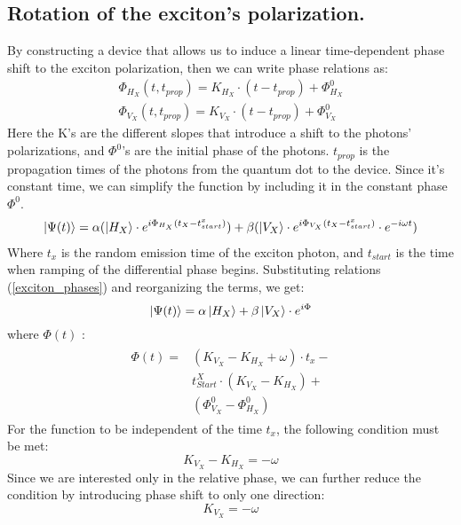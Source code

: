 \subsection*{Rotation of the exciton's polarization.}
By constructing a device that allows us to induce a linear time-dependent phase shift to the exciton polarization, then we can write phase relations as:
\begin{equation} \label{exciton_phases}
	\begin{aligned} 
		&\Phi_{H_{X}}{(t,t_{prop})} = K_{H_{X}}\cdot(t-t_{prop}) + \Phi^0_{H_{X}} &\\
		&\Phi_{V_{X}}{(t,t_{prop})} = K_{V_{X}}\cdot(t-t_{prop}) + \Phi^0_{V_{X}} 
	\end{aligned}
\end{equation}
Here the  K's are the different slopes that introduce a shift to the photons' polarizations, and  $\Phi^0$'s are the initial phase of the photons. $t_{prop}$ is the propagation times of the photons from the quantum dot to the device. Since it's constant time, we can simplify the function by including it in the constant phase $\Phi^0$.
\begin{equation}
	\begin{split}
		\ket{\Psi(t)}= \alpha( \ket{H_{X}}\cdot e^{i\Phi_{H_{X}}(t_{X}-t^{x}_{start})})+
		\beta (\ket{V_{X}}\cdot e^{i\Phi_{V_{X}}(t_{X}-t^{x}_{start})}\cdot e^{-i\omega t})
	\end{split}
\end{equation} 
Where $t_x$ is the random emission time of the exciton photon, and $t_{start}$ is the time when ramping of the differential phase begins. Substituting relations (\ref{exciton_phases}) and reorganizing the terms, we get:
\begin{equation}
	\ket{\Psi(t)} = \alpha\ket{H_X}+\beta\ket{V_X}\cdot e^{i\Phi}
\end{equation}
where $\Phi(t)$ :
\begin{equation}
	\begin{split}  
		\begin{aligned} 
			\Phi(t) = &(K_{V_X}-K_{H_X} + \omega)\cdot t_x -\\
			&t^X_{Start} \cdot(K_{V_X}-K_{H_X})+\\
			&(\Phi^0_{V_{X}}-\Phi^0_{H_{X}})
		\end{aligned}
	\end{split}
\end{equation}
For the function to be independent of the time $t_x$, the following condition must be met:
\begin{equation}
	K_{V_X}-K_{H_X} =-\omega 
\end{equation}
Since we are interested only in the relative phase, we can further reduce the condition by introducing phase shift to only one direction:
\begin{equation}
	K_{V_X} =-\omega 
\end{equation}
